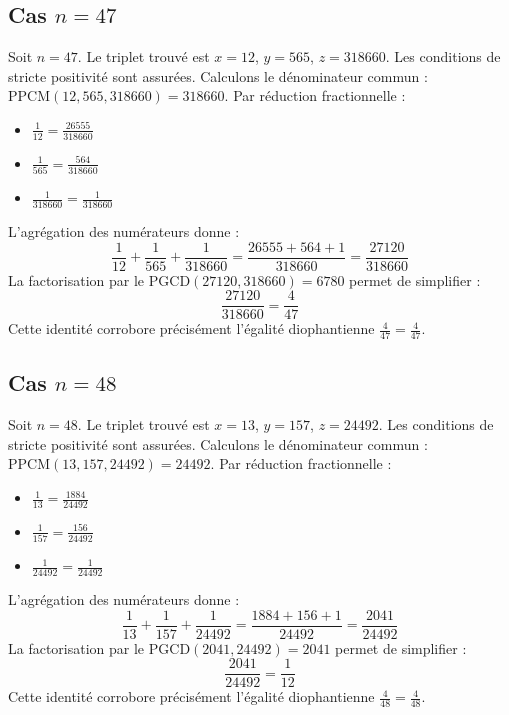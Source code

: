 \documentclass[11pt,a4paper]{article}
\begin{document}
\subsection{Cas $n = 47$}
Soit $n = 47$. Le triplet trouvé est $x = 12$, $y = 565$, $z = 318660$.
Les conditions de stricte positivité sont assurées.
Calculons le dénominateur commun : $\text{PPCM}(12, 565, 318660) = 318660$.
Par réduction fractionnelle :
\begin{itemize}
    \item $\frac{1}{12} = \frac{26555}{318660}$
    \item $\frac{1}{565} = \frac{564}{318660}$
    \item $\frac{1}{318660} = \frac{1}{318660}$
\end{itemize}
L'agrégation des numérateurs donne :
$$ \frac{1}{12} + \frac{1}{565} + \frac{1}{318660} = \frac{26555 + 564 + 1}{318660} = \frac{27120}{318660} $$
La factorisation par le $\text{PGCD}(27120, 318660) = 6780$ permet de simplifier :
$$ \frac{27120}{318660} = \frac{4}{47} $$
Cette identité corrobore précisément l'égalité diophantienne $\frac{4}{47} = \frac{4}{47}$.

\subsection{Cas $n = 48$}
Soit $n = 48$. Le triplet trouvé est $x = 13$, $y = 157$, $z = 24492$.
Les conditions de stricte positivité sont assurées.
Calculons le dénominateur commun : $\text{PPCM}(13, 157, 24492) = 24492$.
Par réduction fractionnelle :
\begin{itemize}
    \item $\frac{1}{13} = \frac{1884}{24492}$
    \item $\frac{1}{157} = \frac{156}{24492}$
    \item $\frac{1}{24492} = \frac{1}{24492}$
\end{itemize}
L'agrégation des numérateurs donne :
$$ \frac{1}{13} + \frac{1}{157} + \frac{1}{24492} = \frac{1884 + 156 + 1}{24492} = \frac{2041}{24492} $$
La factorisation par le $\text{PGCD}(2041, 24492) = 2041$ permet de simplifier :
$$ \frac{2041}{24492} = \frac{1}{12} $$
Cette identité corrobore précisément l'égalité diophantienne $\frac{4}{48} = \frac{4}{48}$.
\end{document}
